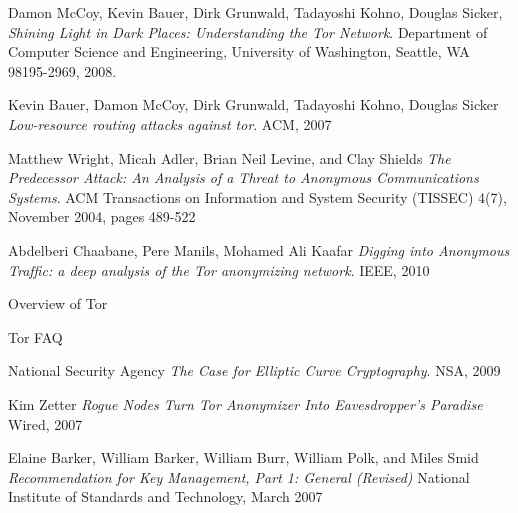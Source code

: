 \documentclass[journal]{IEEEtran}
\begin{document}
\begin{thebibliography}{9}

  Damon McCoy, Kevin Bauer, Dirk Grunwald, Tadayoshi Kohno, Douglas Sicker,
  \emph{Shining Light in Dark Places: Understanding the Tor Network}.
  Department of Computer Science and Engineering,
  University of Washington, Seattle, WA 98195-2969,
  2008.

  Kevin Bauer, Damon McCoy, Dirk Grunwald, Tadayoshi Kohno, Douglas Sicker
  \emph{Low-resource routing attacks against tor}.
  ACM, 2007

  Matthew Wright, Micah Adler, Brian Neil Levine, and Clay Shields
  \emph{The Predecessor Attack: An Analysis of a Threat to Anonymous Communications Systems}.
  ACM Transactions on Information and System Security (TISSEC) 4(7), November 2004, pages 489-522

  Abdelberi Chaabane, Pere Manils, Mohamed Ali Kaafar
  \emph{Digging into Anonymous Trafﬁc: a deep analysis of the Tor anonymizing network}.
  IEEE, 2010

  Overview of Tor

  Tor FAQ

  National Security Agency
  \emph{The Case for Elliptic Curve Cryptography}.
  NSA, 2009

  Kim Zetter
  \emph{Rogue Nodes Turn Tor Anonymizer Into Eavesdropper's Paradise}
  Wired, 2007

  Elaine Barker, William Barker, William Burr, William Polk, and Miles Smid
  \emph{Recommendation for Key Management, Part 1: General (Revised)}
  National Institute of Standards and Technology, March 2007


\end{thebibliography}
\end{document}
